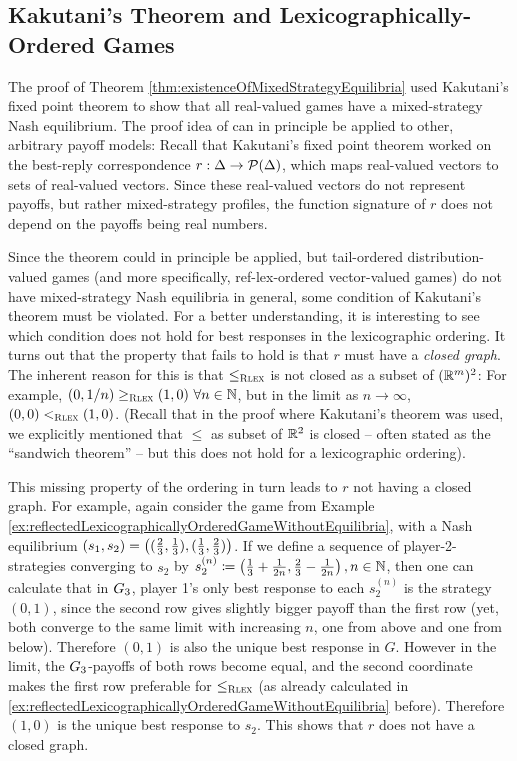 \documentclass[a4paper]{scrreprt}
\theoremstyle{definition}
\begin{document}
    
    \subsection{Kakutani's Theorem and Lexicographically-Ordered Games}
    The proof of Theorem \ref{thm:existenceOfMixedStrategyEquilibria} used Kakutani's fixed point theorem to show that all real-valued games have a mixed-strategy Nash equilibrium.
    The proof idea of can in principle be applied to other, arbitrary payoff models: Recall that Kakutani's fixed point theorem worked on the best-reply correspondence $r: \Delta \to \operatorname{\mathcal{P}}(\Delta)$, which maps real-valued vectors to sets of real-valued vectors. Since these real-valued vectors do not represent payoffs, but rather mixed-strategy profiles, the function signature of $r$ does not depend on the payoffs being real numbers.
    
    Since the theorem could in principle be applied, but tail-ordered distribution-valued games (and more specifically, ref-lex-ordered vector-valued games) do not have mixed-strategy Nash equilibria in general, some condition of Kakutani's theorem must be violated. For a better understanding, it is interesting to see which condition does not hold for best responses in the lexicographic ordering.
    It turns out that the property that fails to hold is that $r$ must have a \emph{closed graph}.
    The inherent reason for this is that $\leq_{\textsc{Rlex}}$ is not closed as a subset of $(\mathbb{R}^m)^2$:
    For example, $(0, 1/n) \geq_{\textsc{Rlex}} (1, 0) ~ \forall n \in \mathbb{N}$, but in the limit as $n \to \infty$, $(0, 0) <_{\textsc{Rlex}} (1, 0)$.
    (Recall that in the proof where Kakutani's theorem was used, we explicitly mentioned that $\leq$ as subset of $\mathbb{R}^2$ is closed -- often stated as the “sandwich theorem” -- but this does not hold for a lexicographic ordering).
    
    This missing property of the ordering in turn leads to $r$ not having a closed graph. For example, again consider the game from Example \ref{ex:reflectedLexicographicallyOrderedGameWithoutEquilibria}, with a Nash equilibrium $(s_1, s_2) = \left((\frac{2}{3}, \frac{1}{3}), (\frac{1}{3}, \frac{2}{3})\right)$.
    If we define a sequence of player-2-strategies converging to $s_2$ by $s_2^{(n)} \coloneqq \left(\frac{1}{3} + \frac{1}{2n}, \frac{2}{3} - \frac{1}{2n}\right), n \in \mathbb{N}$, then one can calculate that in $G_{3}$, player 1's only best response to each $s_2^{(n)}$ is the strategy $(0, 1)$, since the second row gives slightly bigger payoff than the first row (yet, both converge to the same limit with increasing $n$, one from above and one from below). Therefore $(0, 1)$ is also the unique best response in $G$.
    However in the limit, the $G_{3}$-payoffs of both rows become equal, and the second coordinate makes the first row preferable for $\leq_{\textsc{Rlex}}$ (as already calculated in \ref{ex:reflectedLexicographicallyOrderedGameWithoutEquilibria} before). Therefore $(1, 0)$ is the unique best response to $s_2$. This shows that $r$ does not have a closed graph.
    
\end{document}

